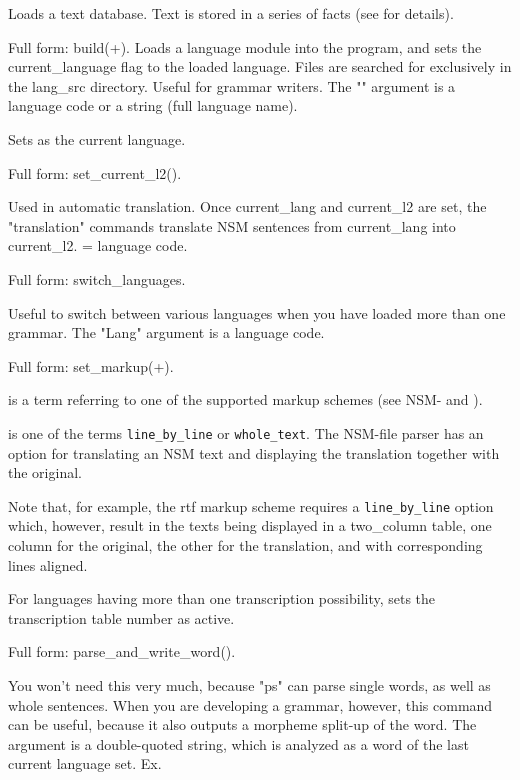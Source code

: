 \documentclass[11pt]{article}
\begin{document}
\begin{description}
Loads a text database. Text is stored in a series of 
facts (see  for details).

Full form: build(+).
Loads a language module into the program, and sets the
current_language flag to the loaded language. Files are searched for
exclusively in the lang_src directory. Useful for grammar writers. The
"" argument is a language code or a string (full language name).

Sets  as the current language.

Full form: set_current_l2().

Used in automatic translation. Once current_lang and current_l2 are
set, the "translation" commands translate NSM sentences from
current_lang into current_l2.  = language code.

Full form: switch_languages.

Useful to switch between various languages when you have loaded more
than one grammar. The "Lang" argument is a language code.

Full form: set_markup(+).

 is a term referring to one of the supported markup
schemes (see NSM- and ).

 is one of the terms \verb$line_by_line$ or \verb$whole_text$.
The NSM-file parser has an option for translating an NSM text
and displaying the translation together with the original.

Note that, for example, the rtf markup scheme requires
a \verb$line_by_line$ option which, however, result in the
texts being displayed in a two_column table, one
column for the original, the other for the translation, and
with corresponding lines aligned.

For languages having more than one transcription possibility,
sets the transcription table number  as active.

Full form: parse_and_write_word().

You won't need this very much, because "ps" can parse single words, as
well as whole sentences. When you are developing a grammar, however,
this command can be useful, because it also outputs a morpheme
split-up of the word. The argument  is a double-quoted string, which
is analyzed as a word of the last current language set. Ex.


\end{description}
\end{document}
